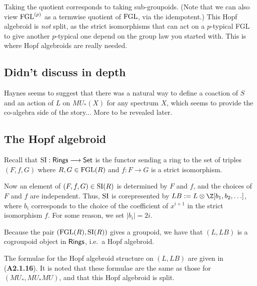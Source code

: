 \documentclass[11pt]{article}
\begin{document}
\begin{Formal Group Laws}
\begin{shaded}
Taking the quotient corresponds to taking sub-groupoids. (Note that we can also view $\textup{FGL}^{(p)}$ as a termwise quotient of $\textup{FGL}$, via the idempotent.) This Hopf algebroid is \emph{not} split, as the strict isomorphisms that can act on a $p$-typical FGL to give another $p$-typical one depend on the group law you started with. This is where Hopf algebroids are really needed.
\subsection*{Didn't discuss in depth}
Haynes seems to suggest that there was a natural way to define a coaction of $S$ and an action of $L$ on $MU_*(X)$ for any spectrum $X$, which seems to provide the co-algebra side of the story... More to be revealed later.


\end{shaded}

\subsection*{The Hopf algebroid}
Recall that $\textup{SI}:\textsf{Rings}\longrightarrow\operatorname{{\mathsf{Set}}}$ is the functor sending a ring to the set of triples $(F,f,G)$ where $R,G\in\textup{FGL}(R)$ and $f:F\to G$ is a strict isomorphism.

Now an element of $(F,f,G)\in\textup{SI}(R)$ is determined by $F$ and $f$, and the choices of $F$ and $f$ are independent. Thus, $\textup{SI}$ is corepresented by $LB:=L\otimes\Z[b_1,b_2,\ldots]$, where $b_i$ corresponds to the choice of the coefficient of $x^{i+1}$ in the strict isomorphism $f$. For some reason, we set $|b_i|=2i$.

Because the pair $(\textup{FGL}(R),\textup{SI}(R))$ gives a groupoid, we have that $(L,LB)$ is a cogroupoid object in $\operatorname{{\mathsf{Rings}}}$, i.e.\ a Hopf algebroid.
\begin{itemise}
\item The formulae for the Hopf algebroid structure on $(L,LB)$ are given in (\textbf{A2.1.16}). It is noted that these formulae are the same as those for $(MU_*,MU_*MU)$, and that this Hopf algebroid is split.
\end{itemise}

\end{Formal Group Laws}
\end{document}
